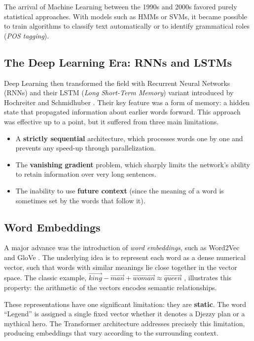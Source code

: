 \documentclass[12pt, a4paper]{report}
\newcommand{\sourced}[1]{#1}        %
\newcommand{\humantext}[1]{#1}      %
\begin{document}
\humantext{The arrival of Machine Learning between the 1990s and 2000s favored purely statistical approaches. With models such as HMMs or SVMs, it became possible to train algorithms to classify text automatically or to identify grammatical roles (\textit{POS tagging}).}

\subsection{The Deep Learning Era: RNNs and LSTMs}
\sourced{Deep Learning then transformed the field with Recurrent Neural Networks (RNNs) and their LSTM (\textit{Long Short-Term Memory}) variant introduced by Hochreiter and Schmidhuber \cite{hochreiter1997lstm}.} \humantext{Their key feature was a form of memory: a hidden state that propagated information about earlier words forward. This approach was effective up to a point, but it suffered from three main limitations.}
\begin{itemize}[noitemsep]
    \item \humantext{A \textbf{strictly sequential} architecture, which processes words one by one and prevents any speed-up through parallelization.}
    \item \humantext{The \textbf{vanishing gradient} problem, which sharply limits the network's ability to retain information over very long sentences.}
    \item \humantext{The inability to use \textbf{future context} (since the meaning of a word is sometimes set by the words that follow it).}
\end{itemize}

\subsection{Word Embeddings}
\sourced{A major advance was the introduction of \textit{word embeddings}, such as Word2Vec \cite{mikolov2013word2vec} and GloVe \cite{pennington2014glove}.} \humantext{The underlying idea is to represent each word as a dense numerical vector, such that words with similar meanings lie close together in the vector space. The classic example,} $\vec{king} - \vec{man} + \vec{woman} \approx \vec{queen}$ \humantext{, illustrates this property: the arithmetic of the vectors encodes semantic relationships.}

\humantext{These representations have one significant limitation: they are \textbf{static}. The word ``Legend'' is assigned a single fixed vector whether it denotes a Djezzy plan or a mythical hero.} \humantext{The Transformer architecture addresses precisely this limitation, producing embeddings that vary according to the surrounding context.}
\end{document}
